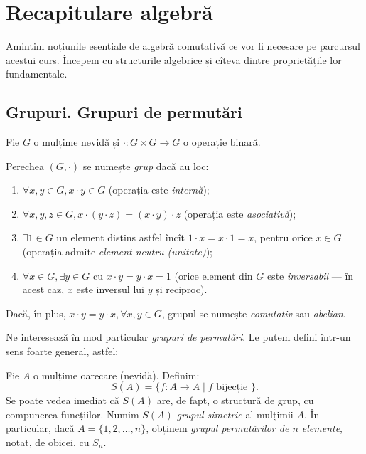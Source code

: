 \chapter{Recapitulare algebră}


Amintim noțiunile esențiale de algebră comutativă ce vor fi necesare
pe parcursul acestui curs. Începem cu structurile algebrice și cîteva dintre
proprietățile lor fundamentale.

\section{Grupuri. Grupuri de permutări}

\begin{definition}\label{def:grup} 
  Fie $ G $ o mulțime nevidă și $ \cdot : G \times G \to G $ o operație binară.

  Perechea $ (G, \cdot) $ se numește \emph{grup} dacă au loc:
  \begin{enumerate}[(G1)]
  \item $ \forall x, y \in G, x \cdot y \in G $ (operația este \emph{internă});
  \item $ \forall x, y, z \in G, x \cdot (y \cdot z) = (x \cdot y) \cdot z $
    (operația este \emph{asociativă});
  \item $ \exists 1 \in G $ un element distins astfel încît $ 1 \cdot x = x \cdot 1 = x $,
    pentru orice $ x \in G $ (operația admite \emph{element neutru (unitate)});
  \item $ \forall x \in G, \exists y \in G $ cu $ x \cdot y = y \cdot x = 1 $
    (orice element din $ G $ este \emph{inversabil} --- în acest caz, $ x $
    este inversul lui $ y $ și reciproc).
  \end{enumerate}

  Dacă, în plus, $ x \cdot y = y \cdot x, \forall x, y \in G $, grupul se
  numește \emph{comutativ} sau \emph{abelian}.
\end{definition}

Ne interesează în mod particular \emph{grupuri de permutări}. Le putem defini
într-un sens foarte general, astfel:
\begin{definition}\label{def:grp-perm} 
  Fie $ A $ o mulțime oarecare (nevidă). Definim:
  \[
    S(A) = \{ f : A \to A \mid f \text{ bijecție } \}.
  \]
  Se poate vedea imediat că $ S(A) $ are, de fapt, o structură de grup, cu
  compunerea funcțiilor. Numim $ S(A) $ \emph{grupul simetric} al mulțimii $ A $.
  În particular, dacă $ A = \{ 1, 2, \dots, n \} $, obținem \emph{grupul permutărilor %
    de $ n $ elemente}, notat, de obicei, cu $ S_n $.
\end{definition}

